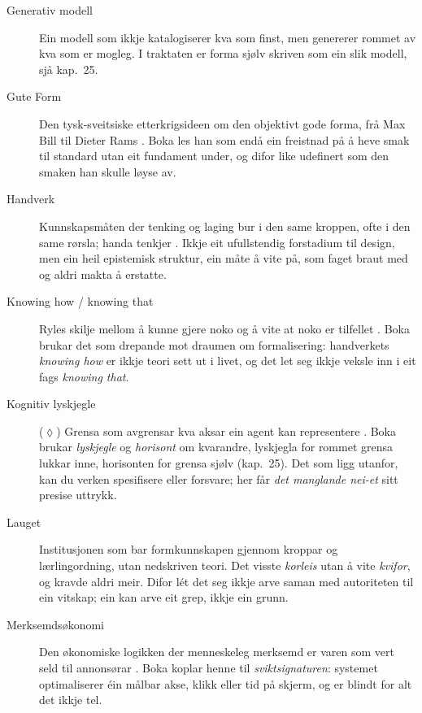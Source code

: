 \begin{description}
\item[Generativ modell] Ein modell som ikkje katalogiserer kva som finst, men genererer rommet av kva som er mogleg. I traktaten er forma sjølv skriven som ein slik modell, sjå kap.~25.

\item[Gute Form] Den tysk-sveitsiske etterkrigsideen om den objektivt gode forma, frå Max Bill til Dieter Rams \autocite{lovell2011rams}. Boka les han som endå ein freistnad på å heve smak til standard utan eit fundament under, og difor like udefinert som den smaken han skulle løyse av.

\item[Handverk] Kunnskapsmåten der tenking og laging bur i den same kroppen, ofte i den same rørsla; handa tenkjer \autocite{sennett2008craftsman}. Ikkje eit ufullstendig forstadium til design, men ein heil epistemisk struktur, ein måte å vite på, som faget braut med og aldri makta å erstatte.

\item[Knowing how / knowing that] Ryles skilje mellom å kunne gjere noko og å vite at noko er tilfellet \autocite{ryle1949mind}. Boka brukar det som drepande mot draumen om formalisering: handverkets \emph{knowing how} er ikkje teori sett ut i livet, og det let seg ikkje veksle inn i eit fags \emph{knowing that}.

\item[Kognitiv lyskjegle] (\(\lozenge\)) Grensa som avgrensar kva aksar ein agent kan representere \autocite{fields2022}. Boka brukar \emph{lyskjegle} og \emph{horisont} om kvarandre, lyskjegla for rommet grensa lukkar inne, horisonten for grensa sjølv (kap.~25). Det som ligg utanfor, kan du verken spesifisere eller forsvare; her får \emph{det manglande nei-et} sitt presise uttrykk.

\item[Lauget] Institusjonen som bar formkunnskapen gjennom kroppar og lærlingordning, utan nedskriven teori. Det visste \emph{korleis} utan å vite \emph{kvifor}, og kravde aldri meir. Difor lét det seg ikkje arve saman med autoriteten til ein vitskap; ein kan arve eit grep, ikkje ein grunn.

\item[Merksemdsøkonomi] Den økonomiske logikken der menneskeleg merksemd er varen som vert seld til annonsørar \autocite{wu2016attention,williams2018standout}. Boka koplar henne til \emph{sviktsignaturen}: systemet optimaliserer éin målbar akse, klikk eller tid på skjerm, og er blindt for alt det ikkje tel.


\end{description}

